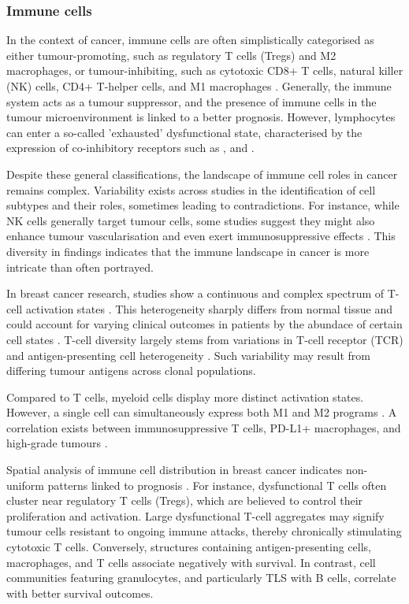 \subsubsection*{Immune cells}

In the context of cancer, immune cells are often simplistically categorised as either tumour-promoting, such as regulatory T cells (Tregs) and M2 macrophages, or tumour-inhibiting, such as cytotoxic CD8+ T cells, natural killer (NK) cells, CD4+ T-helper cells, and M1 macrophages . Generally, the immune system acts as a tumour suppressor, and the presence of immune cells in the tumour microenvironment is linked to a better prognosis. However, lymphocytes can enter a so-called 'exhausted' dysfunctional state, characterised by the expression of co-inhibitory receptors such as ,  and .

Despite these general classifications, the landscape of immune cell roles in cancer remains complex. Variability exists across studies in the identification of cell subtypes and their roles, sometimes leading to contradictions. For instance, while NK cells generally target tumour cells, some studies suggest they might also enhance tumour vascularisation and even exert immunosuppressive effects \parencite{Retecki2021-se}. This diversity in findings indicates that the immune landscape in cancer is more intricate than often portrayed.

In breast cancer research, studies show a continuous and complex spectrum of T-cell activation states \parencite{Azizi2018-vc}. This heterogeneity sharply differs from normal tissue and could account for varying clinical outcomes in patients by the abundace of certain cell states \parencite{Azizi2018-vc,Savas2018-vb}. T-cell diversity largely stems from variations in T-cell receptor (TCR) and antigen-presenting cell heterogeneity \parencite{Azizi2018-vc}. Such variability may result from differing tumour antigens across clonal populations.

Compared to T cells, myeloid cells display more distinct activation states. However, a single cell can simultaneously express both M1 and M2 programs \parencite{Azizi2018-vc}. A correlation exists between immunosuppressive T cells, PD-L1+ macrophages, and high-grade tumours \parencite{Wagner2019-zp}.

Spatial analysis of immune cell distribution in breast cancer indicates non-uniform patterns linked to prognosis \parencite{Danenberg2022-zb}. For instance, dysfunctional T cells often cluster near regulatory T cells (Tregs), which are believed to control their proliferation and activation. Large dysfunctional T-cell aggregates may signify tumour cells resistant to ongoing immune attacks, thereby chronically stimulating cytotoxic T cells. Conversely, structures containing antigen-presenting cells, macrophages, and T cells associate negatively with survival. In contrast, cell communities featuring granulocytes, and particularly \acf{TLS} with B cells, correlate with better survival outcomes.

